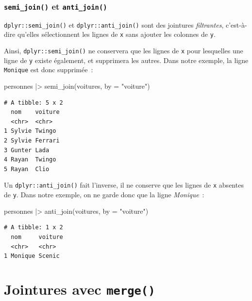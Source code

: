 \documentclass[
  letterpaper,
  DIV=11,
  numbers=noendperiod,
  oneside]{scrreprt}
\newenvironment{Shaded}{\begin{snugshade}}{\end{snugshade}}
\newcommand{\AttributeTok}[1]{\textcolor[rgb]{0.40,0.45,0.13}{#1}}
\newcommand{\FunctionTok}[1]{\textcolor[rgb]{0.28,0.35,0.67}{#1}}
\newcommand{\NormalTok}[1]{\textcolor[rgb]{0.00,0.23,0.31}{#1}}
\newcommand{\SpecialCharTok}[1]{\textcolor[rgb]{0.37,0.37,0.37}{#1}}
\newcommand{\StringTok}[1]{\textcolor[rgb]{0.13,0.47,0.30}{#1}}
\begin{document}
\hypertarget{semi_join-et-anti_join}{%
\subsubsection{\texorpdfstring{\texttt{semi\_join()} et
\texttt{anti\_join()}}{semi\_join() et anti\_join()}}\label{semi_join-et-anti_join}}

\texttt{dplyr::semi\_join()} et \texttt{dplyr::anti\_join()} sont des
jointures \emph{filtrantes}, c'est-à-dire qu'elles sélectionnent les
lignes de \texttt{x} sans ajouter les colonnes de \texttt{y}.

Ainsi, \texttt{dplyr::semi\_join()} ne conservera que les lignes de
\texttt{x} pour lesquelles une ligne de \texttt{y} existe également, et
supprimera les autres. Dans notre exemple, la ligne \texttt{Monique} est
donc supprimée~:

\begin{Shaded}
\begin{Highlighting}[]
\NormalTok{personnes }\SpecialCharTok{|\textgreater{}} \FunctionTok{semi\_join}\NormalTok{(voitures, }\AttributeTok{by =} \StringTok{"voiture"}\NormalTok{)}
\end{Highlighting}
\end{Shaded}

\begin{verbatim}
# A tibble: 5 x 2
  nom    voiture
  <chr>  <chr>  
1 Sylvie Twingo 
2 Sylvie Ferrari
3 Gunter Lada   
4 Rayan  Twingo 
5 Rayan  Clio   
\end{verbatim}

Un \texttt{dplyr::anti\_join()} fait l'inverse, il ne conserve que les
lignes de \texttt{x} absentes de \texttt{y}. Dans notre exemple, on ne
garde donc que la ligne \emph{Monique}~:

\begin{Shaded}
\begin{Highlighting}[]
\NormalTok{personnes }\SpecialCharTok{|\textgreater{}} \FunctionTok{anti\_join}\NormalTok{(voitures, }\AttributeTok{by =} \StringTok{"voiture"}\NormalTok{)}
\end{Highlighting}
\end{Shaded}

\begin{verbatim}
# A tibble: 1 x 2
  nom     voiture
  <chr>   <chr>  
1 Monique Scenic 
\end{verbatim}

\hypertarget{jointures-avec-merge}{%
\section{\texorpdfstring{Jointures avec
\texttt{merge()}}{Jointures avec merge()}}\label{jointures-avec-merge}}
\end{document}

